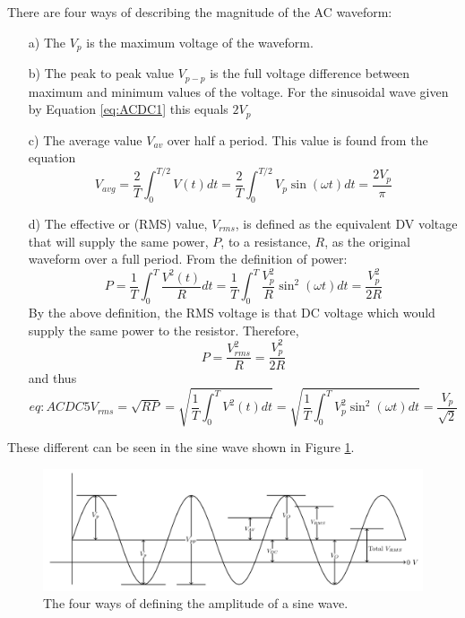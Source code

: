 \noindent There are four ways of describing the magnitude of the AC waveform:
\begin{itemize}
    \item[a)] The  $V_p$ is the maximum voltage of the waveform. 
    \item[b)] The peak to peak value $V_{p-p}$ is the full voltage difference between maximum and minimum values of the voltage. For the sinusoidal wave given by Equation \ref{eq:ACDC1} this equals $2V_p$
    \item[c)] The average value $V_{av}$ over half a period. This value is found from the equation \begin{equation}\label{eq:ACDC2}
            V_{avg} = \frac{2}{T}\int_0^{T/2}V(t)dt = \frac{2}{T}\int_0^{T/2}V_p\sin(\omega t)dt = \frac{2V_p}{\pi}
    \end{equation}
    \item[d)] The effective or  (RMS) value, $V_{rms}$, is defined as the equivalent DV voltage that will supply the same power, $P$, to a resistance, $R$, as the original waveform over a full period. From the definition of power:\begin{equation}\label{eq:ACDC3}
            P=\frac{1}{T}\int_0^T\frac{V^2(t)}{R}dt = \frac{1}{T}\int_0^T\frac{V_p^2}{R}\sin^2(\omega t)dt = \frac{V_p^2}{2R}
    \end{equation}
        By the above definition, the RMS voltage is that DC voltage which would supply the same power to the resistor. Therefore, \begin{equation}\label{eq:ACDC4}
            P = \frac{V_{rms}^2}{R} = \frac{V_p^2}{2R}
        \end{equation}
        and thus \begin{equation}{eq:ACDC5}
            V_{rms} = \sqrt{RP} = \sqrt{\frac{1}{T}\int_0^TV^2(t)dt} = \sqrt{\frac{1}{T}\int_0^TV_p^2\sin^2(\omega t)dt} = \frac{V_p}{\sqrt{2}}
        \end{equation}
\end{itemize}

\noindent These different  can be seen in the sine wave shown in Figure \ref{fig:ACDC4}.

\begin{figure}[H]
    \centering
    \includegraphics[scale = 0.7]{Images/ACDC3.PNG}
    \caption{The four ways of defining the amplitude of a sine wave.}
    \label{fig:ACDC4}
\end{figure}


